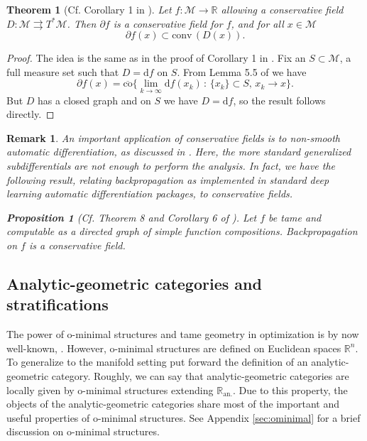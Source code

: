 \documentclass{article}
\newtheorem{proposition}{Proposition}
\newtheorem{theorem}{Theorem}
\newtheorem{remark}{Remark}
\newcommand{\CM}{\mathcal{M}}
\newcommand{\BR}{\mathbb{R}}
\newcommand{\rd}{\mathrm{d}}
\newcommand{\Ran}{\BR_{\text{an.}}}
\begin{document}
\begin{theorem}[Cf. Corollary 1 in \cite{bolte2021conservative}]\label{corr:Clarkeae}
    Let $f:\CM\to \BR$ allowing a conservative field $D:\CM\rightrightarrows T^*\CM$. Then $\partial f$ is a conservative field for $f$, and for all $x\in\CM$
    \begin{equation}
        \partial f(x)\subset \text{conv}\,(D(x)).
    \end{equation}
\end{theorem}

\begin{proof}
    The idea is the same as in the proof of Corollary 1 in \cite{bolte2021conservative}. Fix an $S\subset\CM$, a full measure set such that $ D= \rd f$ on $S$. From Lemma 5.5 of \cite{Hosseini2011Generalized} we have
    \begin{equation}
        \partial f(x)=\overline{\text{co}}\{\lim_{k\to\infty}\rd f(x_k)\,:\,\{x_k\}\subset S,\,x_k\to x\}.
    \end{equation}
    But $D$ has a closed graph and on $S$ we have $D= \rd f$, so the result follows directly. 
\end{proof}

\begin{remark}
 

An important application of conservative fields is to non-smooth automatic differentiation, as discussed in \cite{bolte2021conservative}. Here, the more standard generalized subdifferentials are not enough to perform the analysis. In fact, we have the following result, relating backpropagation as implemented in standard deep learning automatic differentiation packages, to conservative fields.

\begin{proposition}
  [Cf. Theorem 8 and Corollary 6 of \cite{bolte2021conservative}] Let $f$ be tame and computable as a directed graph of simple function compositions.  Backpropagation on $f$ is a conservative field.
\end{proposition}
   
\end{remark}


\subsection{Analytic-geometric categories and stratifications}\label{s:anageomcat}
The power of o-minimal structures and tame geometry in optimization is by now well-known, \cite{Bolte2009Semismooth,davis2020stochastic,bolte2021conservative,difonzo2022stochastic,bareilles2023piecewise}. However, o-minimal structures are defined on Euclidean spaces $\BR^n$. To generalize to the manifold setting \cite{Dries1996GeometricCA} put forward the definition of an analytic-geometric category. Roughly, we can say that analytic-geometric categories are locally given by o-minimal structures extending $\Ran$. Due to this property, the objects of the analytic-geometric categories share most of the important and useful properties of o-minimal structures. See Appendix \ref{sec:ominimal} for a brief discussion on o-minimal structures. 
\end{document}
